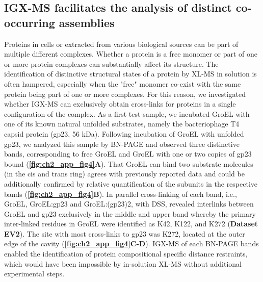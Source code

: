 \subsection*{IGX-MS facilitates the analysis of distinct co-occurring assemblies}
Proteins in cells or extracted from various biological sources can be part of multiple different complexes. Whether a protein is a free monomer or part of one or more protein complexes can substantially affect its structure. The identification of distinctive structural states of a protein by XL-MS in solution is often hampered, especially when the "free" monomer co-exist with the same protein being part of one or more complexes. For this reason, we investigated whether IGX-MS can exclusively obtain cross-links for proteins in a single configuration of the complex. As a first test-sample, we incubated GroEL with one of its known natural unfolded substrates, namely the bacteriophage T4 capsid protein (gp23, 56 kDa). Following incubation of GroEL with unfolded gp23, we analyzed this sample by BN-PAGE and observed three distinctive bands, corresponding to free GroEL and GroEL with one or two copies of gp23 bound (\textbf{\autoref{fig:ch2_app_fig4}A}). That GroEL can bind two substrate molecules (in the cis and trans ring) agrees with previously reported data \cite{van_Duijn_2006} and could be additionally confirmed by relative quantification of the subunits in the respective bands (\textbf{\autoref{fig:ch2_app_fig4}B}). In parallel cross-linking of each band, i.e., GroEL, GroEL:gp23 and GroEL:(gp23)2, with DSS, revealed interlinks between GroEL and gp23 exclusively in the middle and upper band whereby the primary inter-linked residues in GroEL were identified as K42, K122, and K272 (\textbf{Dataset EV2}). The site with most cross-links to gp23 was K272, located at the outer edge of the cavity (\textbf{\autoref{fig:ch2_app_fig4}C-D}). IGX-MS of each BN-PAGE bands enabled the identification of protein compositional specific distance restraints, which would have been impossible by in-solution XL-MS without additional experimental steps.\\
